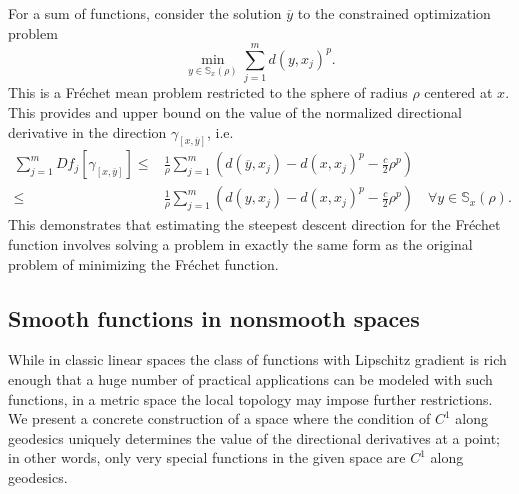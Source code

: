 \documentclass{article}
\theoremstyle{plain}\newtheorem{theorem}{Theorem}[section]
\theoremstyle{plain}\newtheorem{definition}[theorem]{Definition}
\theoremstyle{plain}\newtheorem{lemma}[theorem]{Lemma}
\theoremstyle{definition}\newtheorem{remark}[theorem]{Remark}
\theoremstyle{definition}\newtheorem{example}[theorem]{Example}
\theoremstyle{plain}\newtheorem{proposition}[theorem]{Proposition}
\theoremstyle{plain}\newtheorem{inference}[theorem]{Inference}
\theoremstyle{plain}\newtheorem{corollary}[theorem]{Corollary}
\theoremstyle{plain}\newtheorem{assumption}[theorem]{Assumption}
\begin{document}
For a sum of functions, consider the 
solution $\overline{y}$ to the constrained optimization problem
\begin{equation}\label{eq:sd sum 2}
 \min_{y\in \mathbb{S}_x(\rho)}\sum_{j=1}^m  d(y, x_j)^p.
\end{equation}
This is a Fr\'echet mean problem restricted to the sphere of radius $\rho$ centered at $x$.
This provides and upper bound on the value of the normalized directional derivative 
in the direction $\gamma_{[x,\overline{y}]}$, i.e.
\begin{equation*}
\begin{aligned}
\sum_{j=1}^m Df_j[\gamma_{[x,\overline{y}]}]\leq& 
\tfrac{1}{\rho}\sum_{j=1}^m \left(d(\overline{y}, x_j)- d(x, x_j)^p - \frac{c}{2}\rho^p\right)\\
\leq &
\tfrac{1}{\rho}\sum_{j=1}^m \left(d(y, x_j)- d(x, x_j)^p - \frac{c}{2}\rho^p\right) \quad\forall y\in \mathbb{S}_x(\rho).
\end{aligned}
\end{equation*} 
This demonstrates that estimating the steepest descent direction for the Fr\'echet 
function involves solving a 
problem in exactly the same form as the original problem of 
minimizing the Fr\'echet function.  

\subsection{Smooth functions in nonsmooth spaces}\label{sec: limitation of regularity}
While in classic linear spaces the class of functions with Lipschitz gradient
is rich enough that a huge number of practical applications can be modeled with such
functions, in a metric space the local topology may impose further restrictions.
We present a concrete construction of a space where the condition
of $C^1$ along geodesics uniquely determines the value of the directional
derivatives at a point;  in other words, only very special functions in the given
space are $C^1$ along geodesics.
\end{document}
